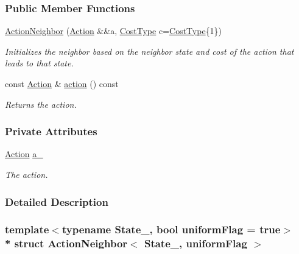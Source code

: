 \subsubsection*{Public Member Functions}
\begin{DoxyCompactItemize}
\item 
\hyperlink{structActionNeighbor_a293ef1ed1c81340a4ff6df4fe4977a77}{Action\+Neighbor} (\hyperlink{structActionNeighbor_addfe8c4e48dfb6b7470701c68cb33a07}{Action} \&\&a, \hyperlink{structCost_a22a996cdc08b472c30d1f410496e041a}{Cost\+Type} c=\hyperlink{structCost_a22a996cdc08b472c30d1f410496e041a}{Cost\+Type}\{1\})
\begin{DoxyCompactList}\small\item\em Initializes the neighbor based on the neighbor state and cost of the action that leads to that state. \end{DoxyCompactList}\item 
const \hyperlink{structActionNeighbor_addfe8c4e48dfb6b7470701c68cb33a07}{Action} \& \hyperlink{structActionNeighbor_ab42e04a933ca75a946ac8bfbb9eaa4c4}{action} () const 
\begin{DoxyCompactList}\small\item\em Returns the action. \end{DoxyCompactList}\end{DoxyCompactItemize}
\subsubsection*{Private Attributes}
\begin{DoxyCompactItemize}
\item 
\hyperlink{structActionNeighbor_addfe8c4e48dfb6b7470701c68cb33a07}{Action} \hyperlink{structActionNeighbor_a48022f1a81f2aff7c73b601e081d6248}{a\+\_\+}\hypertarget{structActionNeighbor_a48022f1a81f2aff7c73b601e081d6248}{}\label{structActionNeighbor_a48022f1a81f2aff7c73b601e081d6248}

\begin{DoxyCompactList}\small\item\em The action. \end{DoxyCompactList}\end{DoxyCompactItemize}


\subsubsection{Detailed Description}
\subsubsection*{template$<$typename State\+\_\+, bool uniform\+Flag = true$>$\\*
struct Action\+Neighbor$<$ State\+\_\+, uniform\+Flag $>$}

